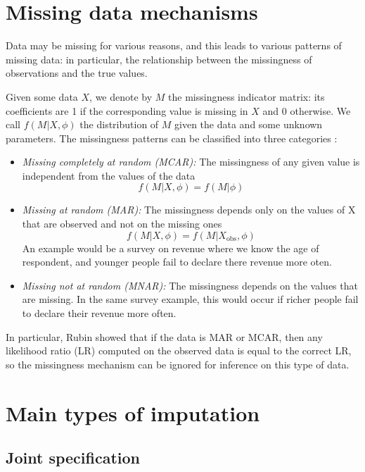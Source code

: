 	\section{Missing data mechanisms}
	Data may be missing for various reasons, and this leads to various patterns of missing data: in particular, the relationship between the missingness of observations and the true values. 
	
	Given some data $X$, we denote by $M$ the missingness indicator matrix: its coefficients are 1 if the corresponding value is missing in $X$ and 0 otherwise. We call $f(M \vert X, \phi)$ the distribution of $M$ given the data and some unknown parameters. The missingness patterns can be classified into three categories \cite{Rubin_missdata}:
	
\begin{itemize}
	\item \emph{Missing completely at random (MCAR):} The missingness of any given value is independent from the values of the data
	$$ f(M \vert X, \phi) = f(M \vert \phi)$$
	\item \emph{Missing at random (MAR):} The missingness depends only on the values of X that are observed and not on the missing ones
	$$f(M \vert X, \phi) = f(M \vert X_{\text{obs}}, \phi)$$
	An example would be a survey on revenue where we know the age of respondent, and younger people fail to declare there revenue more oten.
	\item \emph{Missing not at random (MNAR):} The missingness depends on the values that are missing. In the same survey example, this would occur if richer people fail to declare their revenue more often.
\end{itemize}

In particular, Rubin showed \cite{rubin1976ignorable} that if the data is MAR or MCAR, then any likelihood ratio (LR) computed on the observed data is equal to the correct LR, so the missingness mechanism can be ignored for inference on this type of data.

	\section{Main types of imputation}
		\subsection{Joint specification}
